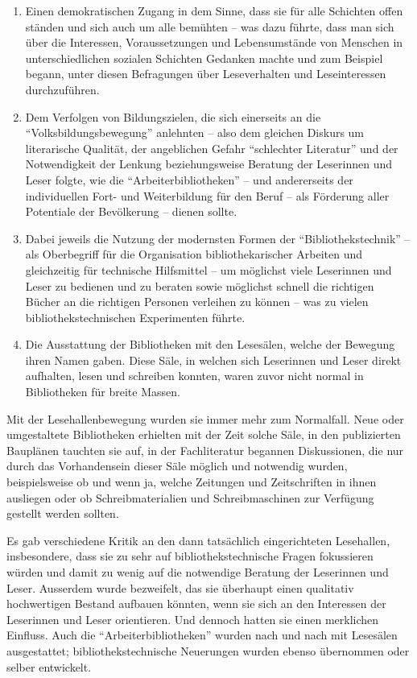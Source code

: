 \documentclass[a4paper,
fontsize=11pt,
oneside,
numbers=noperiodatend,
parskip=half-,
bibliography=totoc,
final
]{scrartcl}
\begin{document}
\begin{enumerate}
\def\labelenumi{(\arabic{enumi})}
\item
  Einen demokratischen Zugang in dem Sinne, dass sie für alle Schichten
  offen ständen und sich auch um alle bemühten -- was dazu führte, dass
  man sich über die Interessen, Voraussetzungen und Lebensumstände von
  Menschen in unterschiedlichen sozialen Schichten Gedanken machte und
  zum Beispiel begann, unter diesen Befragungen über Leseverhalten und
  Leseinteressen durchzuführen.
\item
  Dem Verfolgen von Bildungszielen, die sich einerseits an die
  \enquote{Volksbildungsbewegung} anlehnten -- also dem gleichen Diskurs
  um literarische Qualität, der angeblichen Gefahr \enquote{schlechter
  Literatur} und der Notwendigkeit der Lenkung beziehungsweise Beratung
  der Leserinnen und Leser folgte, wie die
  \enquote{Arbeiterbibliotheken} -- und andererseits der individuellen
  Fort- und Weiterbildung für den Beruf -- als Förderung aller
  Potentiale der Bevölkerung -- dienen sollte.
\item
  Dabei jeweils die Nutzung der modernsten Formen der
  \enquote{Bibliothekstechnik} -- als Oberbegriff für die Organisation
  bibliothekarischer Arbeiten und gleichzeitig für technische
  Hilfsmittel -- um möglichst viele Leserinnen und Leser zu bedienen und
  zu beraten sowie möglichst schnell die richtigen Bücher an die
  richtigen Personen verleihen zu können -- was zu vielen
  bibliothekstechnischen Experimenten führte.
\item
  Die Ausstattung der Bibliotheken mit den Lesesälen, welche der
  Bewegung ihren Namen gaben. Diese Säle, in welchen sich Leserinnen und
  Leser direkt aufhalten, lesen und schreiben konnten, waren zuvor nicht
  normal in Bibliotheken für breite Massen.
\end{enumerate}

Mit der Lesehallenbewegung wurden sie immer mehr zum Normalfall. Neue
oder umgestaltete Bibliotheken erhielten mit der Zeit solche Säle, in
den publizierten Bauplänen tauchten sie auf, in der Fachliteratur
begannen Diskussionen, die nur durch das Vorhandensein dieser Säle
möglich und notwendig wurden, beispielsweise ob und wenn ja, welche
Zeitungen und Zeitschriften in ihnen ausliegen oder ob
Schreibmaterialien und Schreibmaschinen zur Verfügung gestellt werden
sollten.

Es gab verschiedene Kritik an den dann tatsächlich eingerichteten
Lesehallen, insbesondere, dass sie zu sehr auf bibliothekstechnische
Fragen fokussieren würden und damit zu wenig auf die notwendige Beratung
der Leserinnen und Leser. Ausserdem wurde bezweifelt, das sie überhaupt
einen qualitativ hochwertigen Bestand aufbauen könnten, wenn sie sich an
den Interessen der Leserinnen und Leser orientieren. Und dennoch hatten
sie einen merklichen Einfluss. Auch die \enquote{Arbeiterbibliotheken}
wurden nach und nach mit Lesesälen ausgestattet; bibliothekstechnische
Neuerungen wurden ebenso übernommen oder selber entwickelt.
\end{document}
